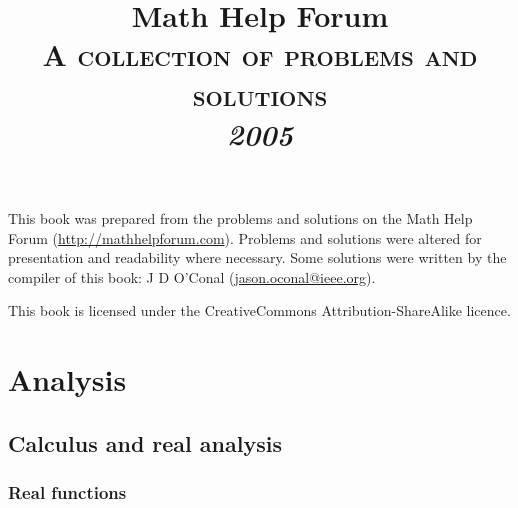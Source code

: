 \documentclass[a4paper,makeidx]{book}
\makeatletter
\renewcommand\tableofcontents{%
    \if@twocolumn
      \@restonecoltrue\onecolumn
    \else
      \@restonecolfalse
    \fi
    \chapter*{\contentsname}%
        \@mkboth{%
           \MakeUppercase\contentsname}{\MakeUppercase\contentsname}%
    \@starttoc{toc}%
    \if@restonecol\twocolumn\fi
    }
\makeatother
\begin{document}
	\title{Math Help Forum\\\vspace{12pt}\Large\textsc{A collection of problems and solutions}\vspace{24pt}\\\vspace{24pt}\Huge\textit{2005}}
	\author{}
	\date{}

	\maketitle

	This book was prepared from the problems and solutions on the Math Help Forum (\url{http://mathhelpforum.com}). Problems and solutions were altered for presentation and readability where necessary. Some solutions were written by the compiler of this book: J D O'Conal (\url{jason.oconal@ieee.org}).

	This book is licensed under the CreativeCommons Attribution-ShareAlike licence.

	\begin{center}\Huge\bysa\normalsize\end{center}

    \tableofcontents




	\part{Analysis}

    \chapter{Calculus and real analysis}

	\section{Real functions}
\end{document}
